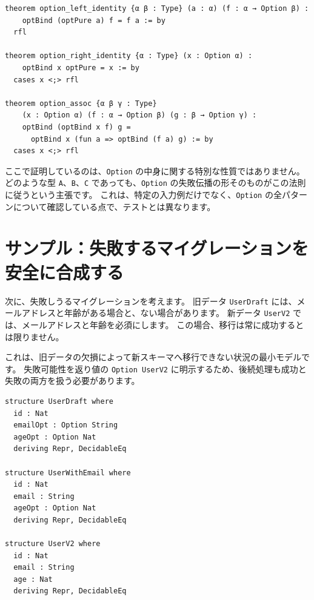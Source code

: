 \begin{listing}[htbp]
\begin{verbatim}
theorem option_left_identity {α β : Type} (a : α) (f : α → Option β) :
    optBind (optPure a) f = f a := by
  rfl

theorem option_right_identity {α : Type} (x : Option α) :
    optBind x optPure = x := by
  cases x <;> rfl

theorem option_assoc {α β γ : Type}
    (x : Option α) (f : α → Option β) (g : β → Option γ) :
    optBind (optBind x f) g =
      optBind x (fun a => optBind (f a) g) := by
  cases x <;> rfl
\end{verbatim}
\caption{\texttt{Option} の三法則}
\label{lst:ch17_option_laws}
\end{listing}

ここで証明しているのは、\texttt{Option} の中身に関する特別な性質ではありません。
どのような型 \texttt{A}、\texttt{B}、\texttt{C} であっても、\texttt{Option} の失敗伝播の形そのものがこの法則に従うという主張です。
これは、特定の入力例だけでなく、\texttt{Option} の全パターンについて確認している点で、テストとは異なります。

\section{サンプル：失敗するマイグレーションを安全に合成する}

次に、失敗しうるマイグレーションを考えます。
旧データ \texttt{UserDraft} には、メールアドレスと年齢がある場合と、ない場合があります。
新データ \texttt{UserV2} では、メールアドレスと年齢を必須にします。
この場合、移行は常に成功するとは限りません。

これは、旧データの欠損によって新スキーマへ移行できない状況の最小モデルです。
失敗可能性を返り値の \texttt{Option UserV2} に明示するため、後続処理も成功と失敗の両方を扱う必要があります。

\begin{listing}[htbp]
\begin{verbatim}
structure UserDraft where
  id : Nat
  emailOpt : Option String
  ageOpt : Option Nat
  deriving Repr, DecidableEq

structure UserWithEmail where
  id : Nat
  email : String
  ageOpt : Option Nat
  deriving Repr, DecidableEq

structure UserV2 where
  id : Nat
  email : String
  age : Nat
  deriving Repr, DecidableEq
\end{verbatim}
\caption{\texttt{UserDraft} と \texttt{UserV2}}
\label{lst:ch17_user_model}
\end{listing}

